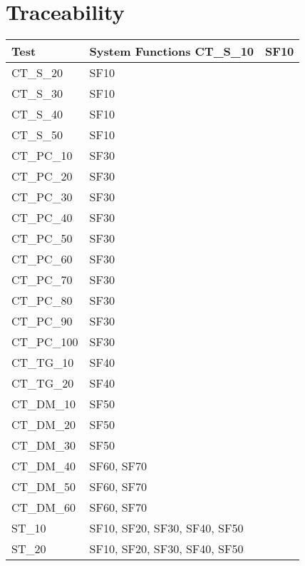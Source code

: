 \documentclass[a4paper, 11pt]{scrreprt}
\begin{document}
\chapter{Traceability}
	\begin{longtabu}{|X[-1,l,m]|X[l,m]|}
	\hline
	\rowfont[l]{\bfseries} Test & System Functions\endhead \hline
		CT\_S\_10 & SF10\\ \hline
		CT\_S\_20 & SF10\\ \hline
		CT\_S\_30 & SF10\\ \hline
		CT\_S\_40 & SF10\\ \hline
		CT\_S\_50 & SF10\\ \hline
		CT\_PC\_10 & SF30\\ \hline
		CT\_PC\_20 & SF30\\ \hline
		CT\_PC\_30 & SF30\\ \hline
		CT\_PC\_40 & SF30\\ \hline
		CT\_PC\_50 & SF30\\ \hline
		CT\_PC\_60 & SF30\\ \hline
		CT\_PC\_70 & SF30\\ \hline
		CT\_PC\_80 & SF30\\ \hline
		CT\_PC\_90 & SF30\\ \hline
		CT\_PC\_100 & SF30\\ \hline
		CT\_TG\_10 & SF40\\ \hline
		CT\_TG\_20 & SF40\\ \hline
		CT\_DM\_10 & SF50\\ \hline
		CT\_DM\_20 & SF50\\ \hline
		CT\_DM\_30 & SF50\\ \hline
		CT\_DM\_40 & SF60, SF70\\ \hline
		CT\_DM\_50 & SF60, SF70\\ \hline
		CT\_DM\_60 & SF60, SF70\\ \hline
		ST\_10 & SF10, SF20, SF30, SF40, SF50\\ \hline
		ST\_20 & SF10, SF20, SF30, SF40, SF50\\ \hline
	\end{longtabu}
\end{document}
